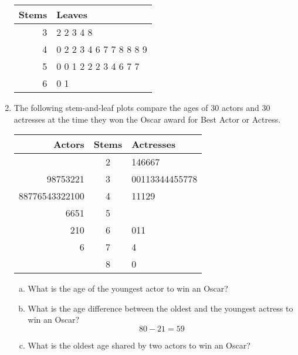 \begin{enumerate}
\begin{center}
\begin{tabular}{r | l}
Stems & Leaves\\
\hline
3 & 2 2 3 4 8\\
4 & 0 2 2 3 4 6 7 7 8 8 8 9\\
5 & 0 0 1 2 2 2 3 4 6 7 7\\
6 & 0 1
\end{tabular}
\end{center}

\item The following stem-and-leaf plots compare the ages of 30 actors and 30 actresses at the time they won the Oscar award for Best Actor or Actress.
\begin{center}
\begin{tabular}{|r | c | l|}
\hline
Actors & Stems & Actresses\\
\hline
& 2 & 146667\\
\hline
98753221 & 3 & 00113344455778\\
\hline
88776543322100 & 4 & 11129\\
\hline
6651 & 5 & \\
\hline
210 & 6 & 011\\
\hline
6 & 7 & 4\\
\hline
& 8 & 0\\
\hline
\end{tabular}
\end{center}
\begin{enumerate}[(a)]
\item What is the age of the youngest actor to win an Oscar? 

\item What is the age difference between the oldest and the youngest actress to win an Oscar? 
\[80 - 21 = 59\]

\item What is the oldest age shared by two actors to win an Oscar? 
\end{enumerate}
\pagebreak


\end{enumerate}
